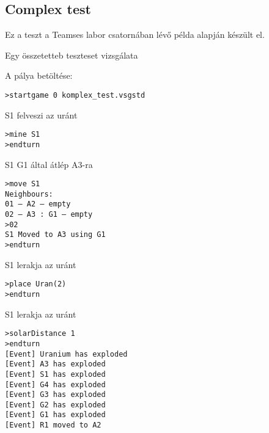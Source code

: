 \documentclass[../../projlab]{subfiles}
\begin{document}
\subsection{Complex test}
\begin{test-case-description}
    Ez a teszt a Teamses labor csatornában lévő példa alapján készült el.
\end{test-case-description}
\begin{test-case-function}
    Egy összetetteb teszteset vizsgálata
\end{test-case-function}
\begin{test-case-input}
A pálya betöltése:
    \begin{verbatim}
>startgame 0 komplex_test.vsgstd
    \end{verbatim}

S1 felveszi az uránt
    \begin{verbatim}
>mine S1
>endturn
    \end{verbatim}

S1 G1 által átlép A3-ra
    \begin{verbatim}
>move S1
Neighbours:
01 – A2 – empty
02 – A3 : G1 – empty
>02
S1 Moved to A3 using G1
>endturn
    \end{verbatim}

S1 lerakja az uránt
    \begin{verbatim}
>place Uran(2)
>endturn        
    \end{verbatim}

S1 lerakja az uránt
    \begin{verbatim}
>solarDistance 1
>endturn
[Event] Uranium has exploded
[Event] A3 has exploded
[Event] S1 has exploded
[Event] G4 has exploded
[Event] G3 has exploded
[Event] G2 has exploded
[Event] G1 has exploded
[Event] R1 moved to A2        
    \end{verbatim}
\end{test-case-input}
\end{document}
